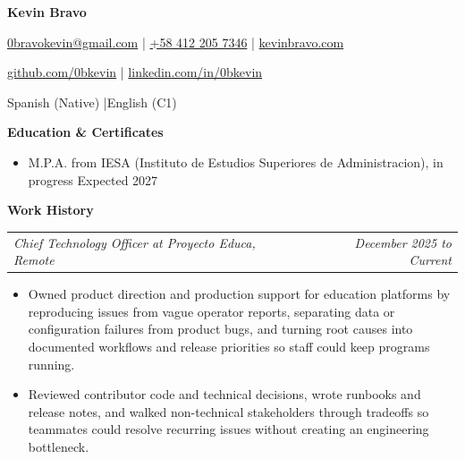 \documentclass[10pt,letterpaper]{article}
\makeatletter
\newcommand{\bodyfont}{\fontsize{10.5}{15.75}\selectfont}
\newcommand{\contactfont}{\fontsize{11.5}{14.5}\selectfont}
\newcommand{\sectiontitle}[1]{%
  \vspace{7pt}
  {\bodyfont\textbf{#1}}\par
  \nopagebreak[4]
  \vspace{4pt}
}
\newcommand{\roleline}[2]{%
  \begin{tabularx}{\textwidth}{@{}Xr@{}}
    \bodyfont\textit{#1} & \bodyfont\textit{#2}
  \end{tabularx}
  \nopagebreak[4]
  \vspace{1pt}
}
\makeatother
\begin{document}
\bodyfont

\begin{center}
  {\fontsize{14}{17}\selectfont\textbf{Kevin Bravo}}\par
  \vspace{3pt}
  {\contactfont
    \href{mailto:0bravokevin@gmail.com}{0bravokevin@gmail.com}
    \enspace|\enspace
    \href{tel:+584122057346}{+58 412 205 7346}
    \enspace|\enspace
    \href{https://kevinbravo.com}{kevinbravo.com}
  }\par
  {\contactfont
    \href{https://github.com/0bkevin}{github.com/0bkevin}
    \enspace|\enspace
    \href{https://www.linkedin.com/in/0bkevin/}{linkedin.com/in/0bkevin}
  }\par
  {\contactfont Spanish (Native) \enspace|\enspace English (C1)}
\end{center}

\sectiontitle{Education \& Certificates}
\begin{itemize}
  \item M.P.A. from IESA (Instituto de Estudios Superiores de Administracion), in progress \hfill Expected 2027
\end{itemize}

\sectiontitle{Work History}

\roleline{Chief Technology Officer at Proyecto Educa, Remote}{December 2025 to Current}
\begin{itemize}
  \item Owned product direction and production support for education platforms by reproducing issues from vague operator reports, separating data or configuration failures from product bugs, and turning root causes into documented workflows and release priorities so staff could keep programs running.
  \item Reviewed contributor code and technical decisions, wrote runbooks and release notes, and walked non-technical stakeholders through tradeoffs so teammates could resolve recurring issues without creating an engineering bottleneck.
\end{itemize}
\end{document}
